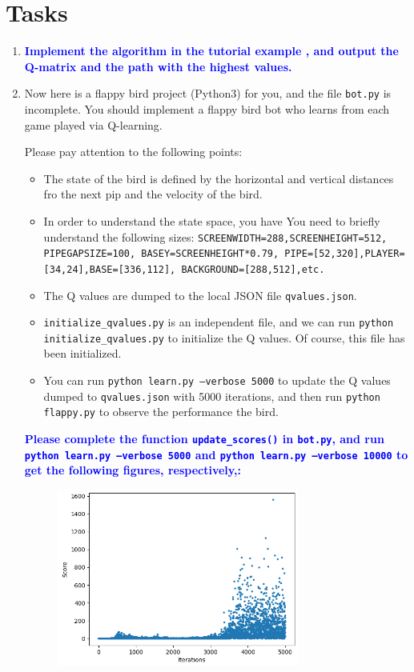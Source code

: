 \documentclass[a4paper, 11pt]{article}
\begin{document}
\section{Tasks}
\begin{enumerate}
	\item \textcolor{blue}{\textbf{Implement the algorithm in the tutorial example , and output the Q-matrix and the path with the highest values.}}
	\item Now here is a flappy bird project (Python3) for you, and the file \texttt{bot.py} is incomplete. You should implement a flappy bird bot who learns from each game played via Q-learning. 

	Please pay attention to the following points:
	\begin{itemize}
		\item The state of the bird is defined by the horizontal and vertical distances fro the next pip and the velocity of the bird.
		\item In order to understand the state space, you have You need to briefly understand the following sizes: \texttt{SCREENWIDTH=288,SCREENHEIGHT=512, PIPEGAPSIZE=100, BASEY=SCREENHEIGHT*0.79, PIPE=[52,320],PLAYER=[34,24],BASE=[336,112], BACKGROUND=[288,512],etc.}
		\item The Q values are dumped to the local JSON file \texttt{qvalues.json}.
		\item \texttt{initialize\_qvalues.py} is an independent file, and we can run \texttt{python initialize\_qvalues.py} to initialize the Q values. Of course, this file has been initialized.
		\item You can run \texttt{python learn.py --verbose 5000} to update the Q values dumped to \texttt{qvalues.json} with 5000 iterations, and then run \texttt{python flappy.py} to observe the performance the bird.
	\end{itemize}
	\textcolor{blue}{\textbf{Please complete the function \texttt{update\_scores()} in \texttt{bot.py}, and run \texttt{python learn.py --verbose 5000} and \texttt{python learn.py --verbose 10000} to get the following figures, respectively,:}}
	\begin{figure}[ht]
	\centering
	\includegraphics[width=8cm]{Pic/score5000}

\end{figure}
\end{enumerate}
\end{document}

